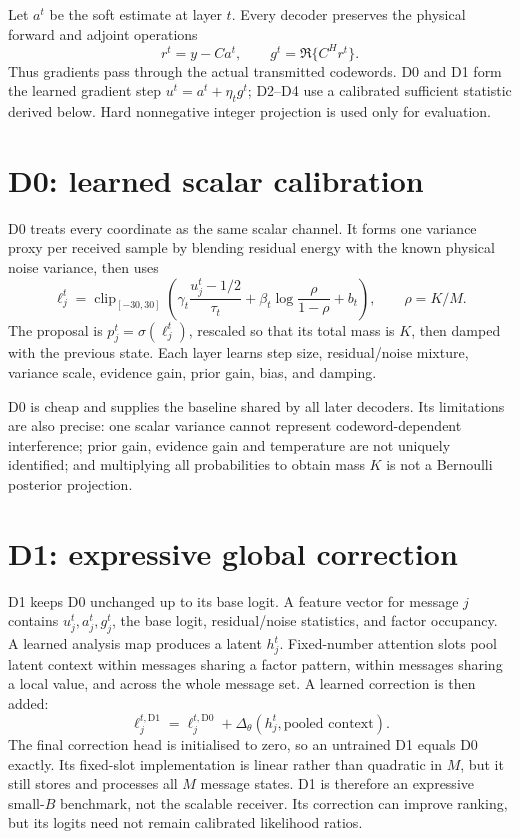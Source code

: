\documentclass[11pt]{article}
\begin{document}
Let $a^t$ be the soft estimate at layer $t$. Every decoder preserves the physical forward and adjoint operations
\[
 r^t=y-Ca^t,
 \qquad g^t=\Re\{C^Hr^t\}.
\]
Thus gradients pass through the actual transmitted codewords. D0 and D1 form the learned gradient step
$u^t=a^t+\eta_tg^t$; D2--D4 use a calibrated sufficient statistic derived below. Hard nonnegative integer projection is
used only for evaluation.

\section{D0: learned scalar calibration}

D0 treats every coordinate as the same scalar channel. It forms one variance proxy per received sample by blending
residual energy with the known physical noise variance, then uses
\[
 \ell_{j}^{t}
 =\operatorname{clip}_{[-30,30]}\!\left(
 \gamma_t\frac{u_j^t-1/2}{\tau_t}
 +\beta_t\log\frac{\rho}{1-\rho}+b_t\right),
 \qquad \rho=K/M.
\]
The proposal is $p_j^t=\sigma(\ell_j^t)$, rescaled so that its total mass is $K$, then damped with the previous state.
Each layer learns step size, residual/noise mixture, variance scale, evidence gain, prior gain, bias, and damping.

D0 is cheap and supplies the baseline shared by all later decoders. Its limitations are also precise: one scalar
variance cannot represent codeword-dependent interference; prior gain, evidence gain and temperature are not uniquely
identified; and multiplying all probabilities to obtain mass $K$ is not a Bernoulli posterior projection.

\section{D1: expressive global correction}

D1 keeps D0 unchanged up to its base logit. A feature vector for message $j$ contains $u_j^t,a_j^t,g_j^t$, the base
logit, residual/noise statistics, and factor occupancy. A learned analysis map produces a latent $h_j^t$. Fixed-number
attention slots pool latent context within messages sharing a factor pattern, within messages sharing a local value,
and across the whole message set. A learned correction is then added:
\[
 \ell_j^{t,\mathrm{D1}}=\ell_j^{t,\mathrm{D0}}+\Delta_\theta(h_j^t,\text{pooled context}).
\]
The final correction head is initialised to zero, so an untrained D1 equals D0 exactly. Its fixed-slot implementation is
linear rather than quadratic in $M$, but it still stores and processes all $M$ message states. D1 is therefore an
expressive small-$B$ benchmark, not the scalable receiver. Its correction can improve ranking, but its logits need not
remain calibrated likelihood ratios.
\end{document}
